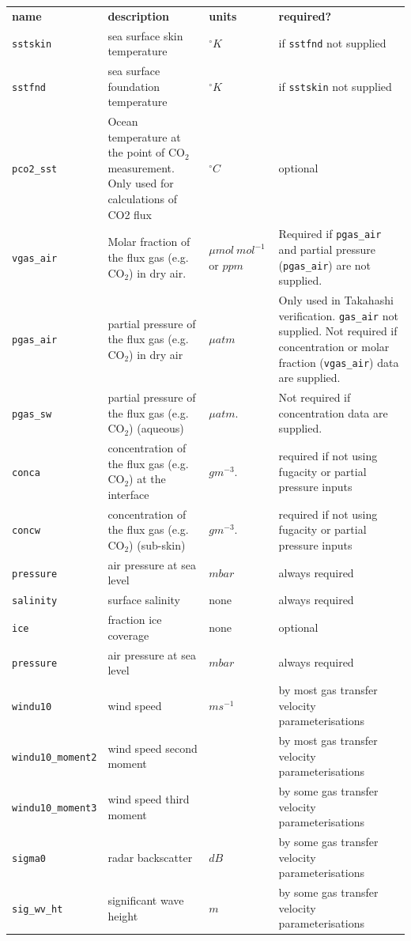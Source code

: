 \documentclass[]{scrartcl}
\begin{document}
\hspace{-2cm}
\begin{table}
	\begin{tabular}{|p{4cm}|p{5cm}|p{2cm}|p{5cm}|}
		\textbf{name} & \textbf{description} & \textbf{units} & \textbf{required?} \\
		\texttt{sstskin} & sea surface skin temperature & $^{\circ}K$ & if \texttt{sstfnd} not supplied \\
		\texttt{sstfnd} & sea surface foundation temperature & $^{\circ}K$ & if \texttt{sstskin} not supplied \\
		\texttt{pco2\_sst} & Ocean temperature at the point of CO$_2$ measurement. Only used for calculations of CO2 flux & $^{\circ}C$ & optional \\
		
		\texttt{vgas\_air} & Molar fraction of the flux gas (e.g. CO$_2$) in dry air. & $\mu mol~mol^{-1}$ or $ppm$ & Required if \texttt{pgas\_air} and partial pressure (\texttt{pgas\_air}) are not supplied. \\
		\texttt{pgas\_air} & partial pressure of the flux gas (e.g. CO$_2$) in dry air & $\mu atm$ & Only used in Takahashi verification. \texttt{gas\_air} not supplied. Not required if concentration or molar fraction (\texttt{vgas\_air}) data are supplied. \\
		\texttt{pgas\_sw} & partial pressure of the flux gas (e.g. CO$_2$) (aqueous) & $\mu atm$. &  Not required if concentration data are supplied. \\
		
		\texttt{conca} & concentration of the flux gas (e.g. CO$_2$) at the interface & $g m^{-3}$. & required if not using fugacity or partial pressure inputs \\
		
		\texttt{concw} & concentration of the flux gas (e.g. CO$_2$) (sub-skin) & $g m^{-3}$. & required if not using fugacity or partial pressure inputs \\
		
		\texttt{pressure} & air pressure at sea level & $mbar$ & always required \\
		\texttt{salinity} & surface salinity & none & always required \\
		\texttt{ice} & fraction ice coverage & none & optional \\
		\texttt{pressure} & air pressure at sea level & $mbar$ & always required \\
		
		\texttt{windu10} & wind speed & $ms^{-1}$ & by most gas transfer velocity parameterisations \\
		\texttt{windu10\_moment2} & wind speed second moment & ~ & by most gas transfer velocity parameterisations \\
		\texttt{windu10\_moment3} & wind speed third moment & ~ & by some gas transfer velocity parameterisations \\
		\texttt{sigma0} & radar backscatter & $dB$ & by some gas transfer velocity parameterisations \\
		\texttt{sig\_wv\_ht} & significant wave height & $m$ & by some gas transfer velocity parameterisations \\
		

\end{tabular}
\end{table}
\end{document}

